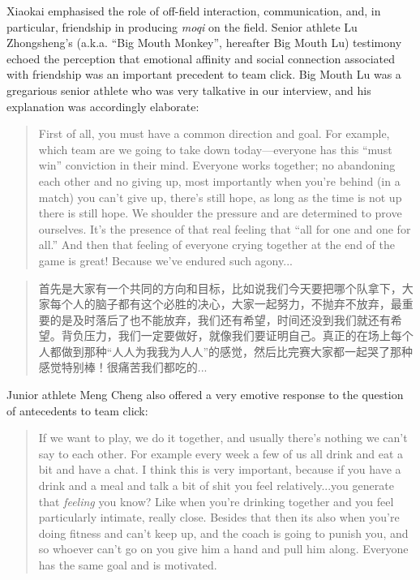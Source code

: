 \begin{CJK}{UTF8}{gbsn}
Xiaokai emphasised the role of off-field interaction, communication, and, in particular, friendship in producing \textit{moqi} on the field.  Senior athlete Lu Zhongsheng's (a.k.a. ``Big Mouth Monkey'', hereafter Big Mouth Lu) testimony echoed the perception that emotional affinity and social connection associated with friendship was an important precedent to team click. Big Mouth Lu was a gregarious senior athlete who was very talkative in our interview, and his explanation was accordingly elaborate:

    \begin{quote}
      First of all, you must have a common direction and goal.  For example, which team are we going to take down today---everyone has this ``must win'' conviction in their mind.  Everyone works together; no abandoning each other and no giving up, most importantly when you're behind (in a match) you can't give up, there's still hope, as long as the time is not up there is still hope.  We shoulder the pressure and are determined to prove ourselves.  It's the presence of that real feeling that ``all for one and one for all.''  And then that feeling of everyone crying together at the end of the game is great! Because we've endured such agony...
    \end{quote}

    \begin{quote}
      首先是大家有一个共同的方向和目标，比如说我们今天要把哪个队拿下，大家每个人的脑子都有这个必胜的决心，大家一起努力，不抛弃不放弃，最重要的是及时落后了也不能放弃，我们还有希望，时间还没到我们就还有希望。背负压力，我们一定要做好，就像我们要证明自己。真正的在场上每个人都做到那种“人人为我我为人人”的感觉，然后比完赛大家都一起哭了那种感觉特别棒！很痛苦我们都吃的...
    \end{quote}

Junior athlete Meng Cheng also offered a very emotive response to the question of antecedents to team click:

      \begin{quote}
        If we want to play, we do it together, and usually there's nothing we can't say to each other.  For example every week a few of us all drink and eat a bit and have a chat.  I think this is very important, because if you have a drink and a meal and talk a bit of shit you feel relatively...you generate that \textit{feeling} you know? Like when you're drinking together and you feel particularly intimate, really close.  Besides that then its also when you're doing fitness and can't keep up, and the coach is going to punish you, and so whoever can't go on you give him a hand and pull him along.  Everyone has the same goal and is motivated.
      \end{quote}


\end{CJK}
